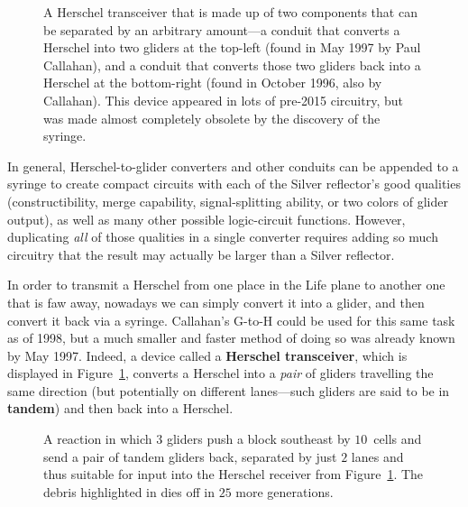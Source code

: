 \begin{figure}[!htb]
	\centering
	\caption{A Herschel transceiver that is made up of two components that can be separated by an arbitrary amount---a conduit that converts a Herschel into two gliders at the top-left (found in May 1997 by Paul Callahan), and a conduit that converts those two gliders back into a Herschel at the bottom-right (found in October 1996, also by Callahan). This device appeared in lots of pre-2015 circuitry, but was made almost completely obsolete by the discovery of the syringe.}
	\label{fig:herschel_transceiver}
\end{figure}

In general, Herschel-to-glider converters and other conduits can be appended to a syringe to create compact circuits with each of the Silver reflector's good qualities (constructibility, merge capability, signal-splitting ability, or two colors of glider output), as well as many other possible logic-circuit functions. However, duplicating \emph{all} of those qualities in a single converter requires adding so much circuitry that the result may actually be larger than a Silver reflector.

In order to transmit a Herschel from one place in the Life plane to another one that is faw away, nowadays we can simply convert it into a glider, and then convert it back via a syringe. Callahan's G-to-H could be used for this same task as of 1998, but a much smaller and faster method of doing so was already known by May 1997. Indeed, a device called a \textbf{Herschel transceiver}, which is displayed in Figure~\ref{fig:herschel_transceiver}, converts a Herschel into a \emph{pair} of gliders travelling the same direction (but potentially on different lanes---such gliders are said to be in \textbf{tandem}) and then back into a Herschel.

\begin{figure}[!htb]
	\centering{}
	\caption{A reaction in which $3$ gliders push a block southeast by $10$~cells and send a pair of tandem gliders back, separated by just $2$ lanes and thus suitable for input into the Herschel receiver from Figure~\ref{fig:herschel_transceiver}. The debris highlighted in  dies off in $25$ more generations.}\label{fig:block_pusher}
\end{figure}

